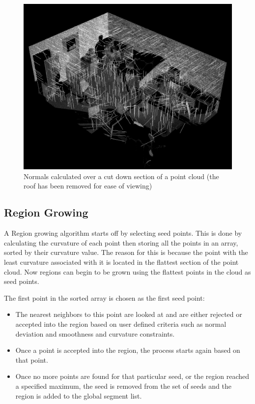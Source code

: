 			\begin{figure}[H]
			\centering
			\includegraphics[width=0.7\linewidth]{Includes/images/Normals}
			\caption{Normals calculated over a cut down section of a point cloud (the roof has been removed for ease of viewing)}
			\label{fig:Normals}
			\end{figure}
		

				
	\subsection{Region Growing}
		
		A Region growing algorithm starts off by selecting seed points. This is done by calculating the curvature of each point then storing all the points in an array, sorted by their curvature value. The reason for this is because the point with the least curvature associated with it is located in the flattest section of the point cloud. Now regions can begin to be grown using the flattest points in the cloud as seed points. 
		
		The first point in the sorted array is chosen as the first seed point:
		
		\begin{itemize}
			
			\item The nearest neighbors to this point are looked at and are either rejected or accepted into the region based on user defined criteria such as normal deviation and smoothness and curvature constraints.
			
			\item Once a point is accepted into the region, the process starts again based on that point.
			
			\item Once no more points are found for that particular seed, or the region reached a specified maximum, the seed is removed from the set of seeds and the region is added to the global segment list. 
			
		\end{itemize}
		
